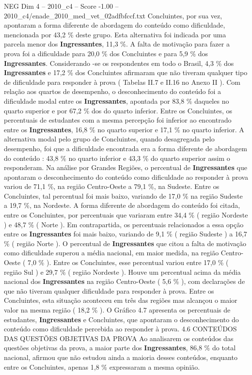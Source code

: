 \begin{textsample}{NEG Dim 4 – 2010\_c4 – Score -1.00 – 2010\_c4/enade\_2010\_med\_vet\_02adfbfccf.txt}
Concluintes, por sua vez, apontaram a forma diferente de abordagem do conteúdo como dificuldade, mencionada por 43,2 \% deste grupo.
Esta alternativa foi indicada por uma parcela menor dos \textbf{Ingressantes}, 11,3 \%.
A falta de motivação para fazer a prova foi a dificuldade para 20,0 \% dos Concluintes e para 5,9 \% dos \textbf{Ingressantes}.
Considerando -se os respondentes em todo o Brasil, 4,3 \% dos \textbf{Ingressantes} e 17,2 \% dos Concluintes afirmaram que não tiveram qualquer tipo de dificuldade para responder à prova ( Tabelas II.7 e II.16 no Anexo II ).
Com relação aos quartos de desempenho, o desconhecimento do conteúdo foi a dificuldade modal entre os \textbf{Ingressantes}, apontada por 83,8 \% daqueles no quarto superior e por 67,2 \% dos do quarto inferior.
Entre os Concluintes, os percentuais de estudantes com a mesma percepção foi inferior ao encontrado entre os \textbf{Ingressantes}, 16,8 \% no quarto superior e 17,1 \% no quarto inferior.
A alternativa modal pelo grupo de Concluintes, quando desagregada pelo desempenho, foi que a dificuldade encontrada era a forma diferente de abordagem do conteúdo : 43,8 \% no quarto inferior e 43,3 \% do quarto superior assim o responderam.
Na análise por Grandes Regiões, o percentual de \textbf{Ingressantes} que apontaram o desconhecimento do conteúdo como dificuldade ao responder à prova variou de 71,1 \%, na região Centro-Oeste a 79,1 \%, na Sudeste.
Entre os Concluintes, tal percentual foi mais baixo, variando de 17,0 \% na região Sudeste a 19,7 \%, na Nordeste.
A forma diferente de abordagem do conteúdo foi citada, entre os Concluintes, por percentuais que variaram entre 34,4 \% ( região Nordeste ) e 48,7 \% ( Norte ).
Em contrapartida, os percentuais relacionados a essa opção entre os \textbf{Ingressantes} foi mais baixo, variando de 9,1 \% ( região Sudeste ) a 16,7 \% ( região Norte ).
O percentual de \textbf{Ingressantes} que citou a falta de motivação como dificuldade superou a média nacional, em maior medida, na região Centro-Oeste ( 7,0 \% ).
Entre os Concluintes, esse percentual variou entre 17,0 \% ( região Sul ) e 29,7 \% ( região Nordeste ).
Houve um percentual acima da média nacional dos \textbf{Ingressantes} na região Centro-Oeste ( 5,6 \% ), com declarações de que não tiveram qualquer dificuldade para responder à prova.
Entre os Concluintes, esta situação aconteceu em três das regiões mas alcançou o maior valor na mesma região ( 18,2 \% ).
O Gráfico 4.7 apresenta os percentuais de estudantes, \textbf{Ingressantes} e Concluintes, que apontaram o desconhecimento do conteúdo como dificuldade percebida ao responder à prova. 4.6 CONTEÚDOS DAS QUESTÕES OBJETIVAS DA PROVA Ao analisarem os conteúdos das questões objetivas da prova, a maior parte dos \textbf{Ingressantes}, 86,8 \% do total nacional, afirmou que não estudou ainda a maioria desses conteúdos, enquanto entre os Concluintes, apenas 1,8 \% expressaram a mesma opinião.

\end{textsample}
